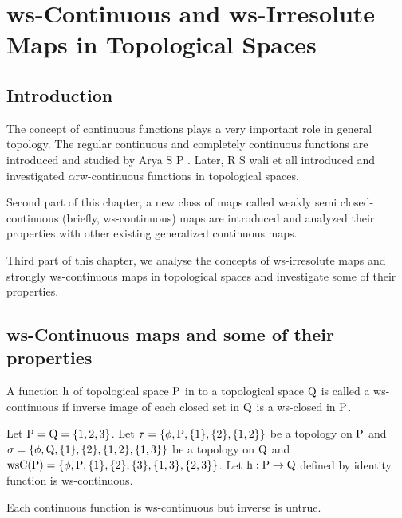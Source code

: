 \chapter{ws-Continuous and ws-Irresolute Maps in Topological Spaces}
\graphicspath{{Chapter3/Chapter3Figs/EPS/}{Chapter3/Chapter3Figs/}}

\section{Introduction}\label{sec3.1}

The concept of continuous functions plays a very important role in general topology. The regular continuous and completely continuous functions are introduced and studied by Arya S P \cite{Arya1}. Later, R S wali et all \cite{Benchalli} introduced and investigated $\alpha$rw-continuous functions in topological spaces.

Second part of this chapter, a new class of maps called weakly semi closed-continuous (briefly, ws-continuous) maps are introduced and analyzed their properties with other existing generalized continuous maps.

Third part of this chapter, we analyse the concepts of ws-irresolute maps and strongly ws-continuous maps in topological spaces and investigate some of their properties.

\section{ws-Continuous maps and some of their properties}\label{sec3.2}

\begin{dfn}\label{defi3.2.1}
A function $\mathrm{h}$ of topological space $\mathrm{P}$ in to a topological space $\mathrm{Q}$ is called a ws-continuous if inverse image of each closed set in $\mathrm{Q}$ is a ws-closed in $\mathrm{P}$.
\end{dfn}

\begin{exm}\label{exam3.2.1}
Let $\mathrm{P}=\mathrm{Q}= \{1, 2, 3\}$. Let $\tau = \{\phi, \mathrm{P}, \{1\}, \{2\}, \{1, 2\}\}$ be a topology on $\mathrm{P}$ and $\sigma = \{\phi, \mathrm{Q}, \{1\}, \{2\}, \{1, 2\}, \{1, 3\}\}$ be a topology on $\mathrm{Q}$ and $\mathrm{ws}\mathrm{C}(\mathrm{P}) = \{\phi, \mathrm{P}, \{1\}, \{2\},\{3\}, \{1, 3\},\{2, 3\}\}$. Let $\mathrm{h}: \mathrm{P}\to \mathrm{Q}$ defined by identity function is ws-continuous.
\end{exm}

\begin{thm}\label{thm3.2.1}
Each continuous function is ws-continuous but inverse is untrue.
\end{thm}

